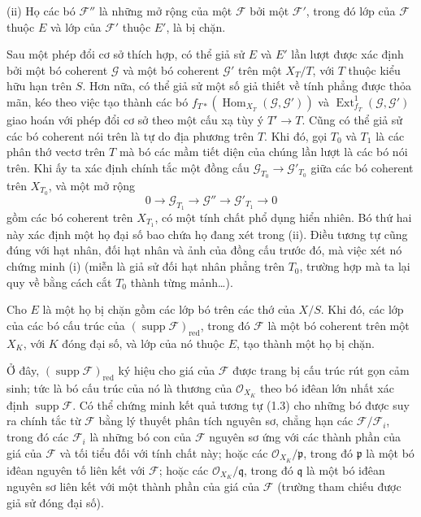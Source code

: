 \smallskip
\noindent (ii) Họ các bó $\mathcal F''$ là những mở rộng của một $\mathcal F$
bởi một $\mathcal F'$, trong đó lớp của $\mathcal F$ thuộc $E$ và lớp của
$\mathcal F'$ thuộc $E'$, là bị chặn.

Sau một phép đổi cơ sở thích hợp, có thể giả sử $E$ và $E'$ lần lượt được xác
định bởi một bó coherent $\mathcal G$ và một bó coherent $\mathcal G'$ trên
một $X_T/T$, với $T$ thuộc kiểu hữu hạn trên $S$. Hơn nữa, có thể giả sử một
số giả thiết về tính phẳng được thỏa mãn, kéo theo việc tạo thành các bó
$f_{T*}(\operatorname{Hom}_{X_T}(\mathcal G,\mathcal G'))$ và
$\operatorname{Ext}^{1}_{f_T}(\mathcal G,\mathcal G')$ giao hoán với phép đổi
cơ sở theo một cấu xạ tùy ý $T'\longrightarrow T$. Cũng có thể giả sử các bó
coherent nói trên là tự do địa phương trên $T$. Khi đó, gọi $T_0$ và $T_1$
là các phân thớ vectơ trên $T$ mà bó các mầm tiết diện của chúng lần lượt là
các bó nói trên. Khi ấy ta xác định chính tắc một đồng cấu
$\mathcal G_{T_0}\longrightarrow\mathcal G'_{T_0}$ giữa các bó coherent trên
$X_{T_0}$, và một mở rộng
\[
0\longrightarrow\mathcal G_{T_1}\longrightarrow\mathcal G''
\longrightarrow\mathcal G'_{T_1}\longrightarrow0
\]
gồm các bó coherent trên $X_{T_1}$, có một tính chất phổ dụng hiển nhiên. Bó
thứ hai này xác định một họ đại số bao chứa họ đang xét trong (ii). Điều tương
tự cũng đúng với hạt nhân, đối hạt nhân và ảnh của đồng cấu
trước đó, mà việc xét nó chứng minh (i) (miễn là giả sử đối hạt nhân phẳng trên
$T_0$, trường hợp mà ta lại quy về bằng cách cắt $T_0$ thành từng
mảnh\ldots).

 Cho $E$ là một họ bị chặn gồm các lớp bó trên các thớ
của $X/S$. Khi đó, các lớp của các bó cấu trúc của
$(\operatorname{supp}\mathcal F)_{\mathrm{red}}$, trong đó $\mathcal F$ là một
bó coherent trên một $X_K$, với $K$ đóng đại số, và lớp của nó thuộc $E$, tạo
thành một họ bị chặn.

Ở đây, $(\operatorname{supp}\mathcal F)_{\mathrm{red}}$ ký hiệu cho giá của
$\mathcal F$ được trang bị cấu trúc rút gọn cảm sinh; tức là bó cấu trúc của nó
là thương của $\mathcal O_{X_K}$ theo bó iđêan lớn nhất xác định
$\operatorname{supp}\mathcal F$. Có thể chứng minh kết quả tương tự (1.3) cho
những bó được suy ra chính tắc từ $\mathcal F$ bằng lý thuyết phân tích nguyên
sơ, chẳng hạn các $\mathcal F/\mathcal F_i$, trong đó các $\mathcal F_i$ là
những bó con của $\mathcal F$ nguyên sơ ứng với các thành phần của giá của
$\mathcal F$ và tối tiểu đối với tính chất này; hoặc các
$\mathcal O_{X_K}/\mathfrak p$, trong đó $\mathfrak p$ là một bó iđêan nguyên
tố liên kết với $\mathcal F$; hoặc các $\mathcal O_{X_K}/\mathfrak q$, trong đó
$\mathfrak q$ là một bó iđêan nguyên sơ liên kết với một thành phần của giá của
$\mathcal F$ (trường tham chiếu được giả sử đóng đại số).

